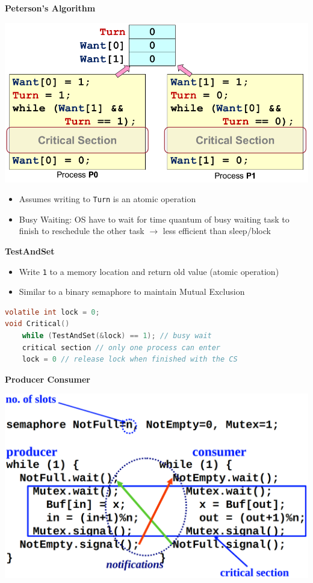 \documentclass[a4paper, 12pt]{article}
\begin{document}
\begin{multicols*}{3}
\medskip

\textbf{Peterson's Algorithm}
\begin{center}
    \includegraphics[scale=0.23]{petersons-algorithm.png}
\end{center}
\begin{itemize}
    \item Assumes writing to \texttt{Turn} is an atomic operation
    \item Busy Waiting: OS have to wait for time quantum of busy waiting task to finish to reschedule the other task $\rightarrow$ less efficient than sleep/block
\end{itemize}

\medskip 

\textbf{TestAndSet}
\begin{itemize}
    \item Write \texttt{1} to a memory location and return old value (atomic operation)
    \item Similar to a binary semaphore to maintain Mutual Exclusion
\end{itemize}
\begin{lstlisting}[language=C]
volatile int lock = 0;
void Critical()
    while (TestAndSet(&lock) == 1); // busy wait
    critical section // only one process can enter
    lock = 0 // release lock when finished with the CS
\end{lstlisting}

\medskip

\textbf{Producer Consumer}
\begin{center}
    \includegraphics[scale=0.18]{producer-consumer.png}    
\end{center}


\end{multicols*}
\end{document}
